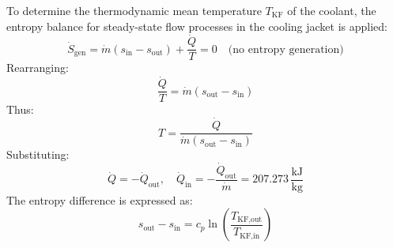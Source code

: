 To determine the thermodynamic mean temperature \( T_{\text{KF}} \) of the coolant, the entropy balance for steady-state flow processes in the cooling jacket is applied:  
\[
\dot{S}_{\text{gen}} = \dot{m} \left( s_{\text{in}} - s_{\text{out}} \right) + \frac{\dot{Q}}{T} = 0 \quad \text{(no entropy generation)}
\]  
Rearranging:  
\[
\frac{\dot{Q}}{T} = \dot{m} \left( s_{\text{out}} - s_{\text{in}} \right)
\]  
Thus:  
\[
T = \frac{\dot{Q}}{\dot{m} \left( s_{\text{out}} - s_{\text{in}} \right)}
\]  
Substituting:  
\[
\dot{Q} = -\dot{Q}_{\text{out}}, \quad \dot{Q}_{\text{in}} = -\frac{\dot{Q}_{\text{out}}}{\dot{m}} = 207.273 \, \frac{\text{kJ}}{\text{kg}}
\]  
The entropy difference is expressed as:  
\[
s_{\text{out}} - s_{\text{in}} = c_p \ln \left( \frac{T_{\text{KF,out}}}{T_{\text{KF,in}}} \right)
\]